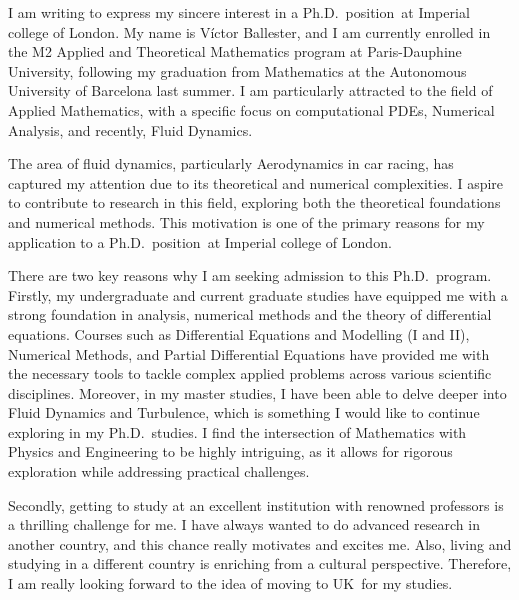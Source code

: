 \documentclass{letter}
\newcommand{\program}{Ph.D.\ position}
\newcommand{\uni}{Imperial college of London}
\newcommand{\city}{UK}
\begin{document}
\begin{letter}




  I am writing to express my sincere interest in a \program\ at \uni. My name is Víctor Ballester, and I am currently enrolled in the M2 Applied and Theoretical Mathematics program at Paris-Dauphine University, following my graduation from Mathematics at the Autonomous University of Barcelona last summer. I am particularly attracted to the field of Applied Mathematics, with a specific focus on computational PDEs, Numerical Analysis, and recently, Fluid Dynamics.


  The area of fluid dynamics, particularly Aerodynamics in car racing, has captured my attention due to its theoretical and numerical complexities. I aspire to contribute to research in this field, exploring both the theoretical foundations and numerical methods. This motivation is one of the primary reasons for my application to a \program\ at \uni.


  There are two key reasons why I am seeking admission to this Ph.D.\ program. Firstly, my undergraduate and current graduate studies have equipped me with a strong foundation in analysis, numerical methods and the theory of differential equations. Courses such as Differential Equations and Modelling (I and II), Numerical Methods, and Partial Differential Equations have provided me with the necessary tools to tackle complex applied problems across various scientific disciplines. Moreover, in my master studies, I have been able to delve deeper into Fluid Dynamics and Turbulence, which is something I would like to continue exploring in my Ph.D.\ studies.
  I find the intersection of Mathematics with Physics and Engineering to be highly intriguing, as it allows for rigorous exploration while addressing practical challenges.

  Secondly, getting to study at an excellent institution with renowned professors is a thrilling challenge for me. I have always wanted to do advanced research in another country, and this chance really motivates and excites me. Also, living and studying in a different country is enriching from a cultural perspective. Therefore, I am really looking forward to the idea of moving to \city\ for my studies.


\end{letter}
\end{document}
